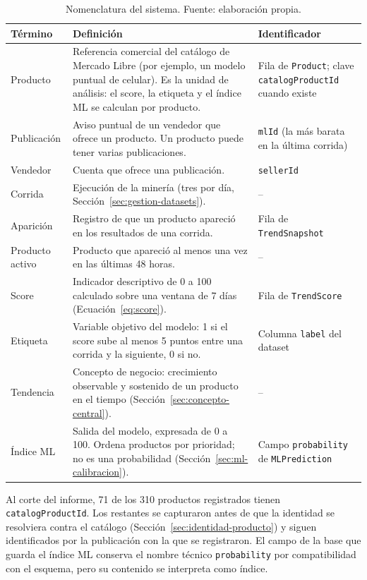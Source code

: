 \begin{table}[H]
	\centering
	\small
	\caption{Nomenclatura del sistema. Fuente: elaboración propia.}
	\label{tab:nomenclatura}
	\begin{tabularx}{\textwidth}{@{}>{\raggedright\arraybackslash}p{2.6cm} X >{\raggedright\arraybackslash}p{3.6cm}@{}}
		\toprule
		\textbf{Término} & \textbf{Definición} & \textbf{Identificador} \\
		\midrule
		Producto & Referencia comercial del catálogo de Mercado Libre (por ejemplo, un modelo puntual de celular). Es la unidad de análisis: el score, la etiqueta y el índice ML se calculan por producto. & Fila de \texttt{Product}; clave \texttt{catalogProductId} cuando existe \\
		Publicación & Aviso puntual de un vendedor que ofrece un producto. Un producto puede tener varias publicaciones. & \texttt{mlId} (la más barata en la última corrida) \\
		Vendedor & Cuenta que ofrece una publicación. & \texttt{sellerId} \\
		Corrida & Ejecución de la minería (tres por día, Sección~\ref{sec:gestion-datasets}). & -- \\
		Aparición & Registro de que un producto apareció en los resultados de una corrida. & Fila de \texttt{TrendSnapshot} \\
		Producto activo & Producto que apareció al menos una vez en las últimas 48 horas. & -- \\
		Score & Indicador descriptivo de 0 a 100 calculado sobre una ventana de 7 días (Ecuación~\ref{eq:score}). & Fila de \texttt{TrendScore} \\
		Etiqueta & Variable objetivo del modelo: 1 si el score sube al menos 5 puntos entre una corrida y la siguiente, 0 si no. & Columna \texttt{label} del dataset \\
		Tendencia & Concepto de negocio: crecimiento observable y sostenido de un producto en el tiempo (Sección~\ref{sec:concepto-central}). & -- \\
		Índice ML & Salida del modelo, expresada de 0 a 100. Ordena productos por prioridad; no es una probabilidad (Sección~\ref{sec:ml-calibracion}). & Campo \texttt{probability} de \texttt{MLPrediction} \\
		\bottomrule
	\end{tabularx}
\end{table}

Al corte del informe, 71 de los 310 productos registrados tienen \texttt{catalogProductId}. Los restantes se capturaron antes de que la identidad se resolviera contra el catálogo (Sección~\ref{sec:identidad-producto}) y siguen identificados por la publicación con la que se registraron. El campo de la base que guarda el índice ML conserva el nombre técnico \texttt{probability} por compatibilidad con el esquema, pero su contenido se interpreta como índice.

